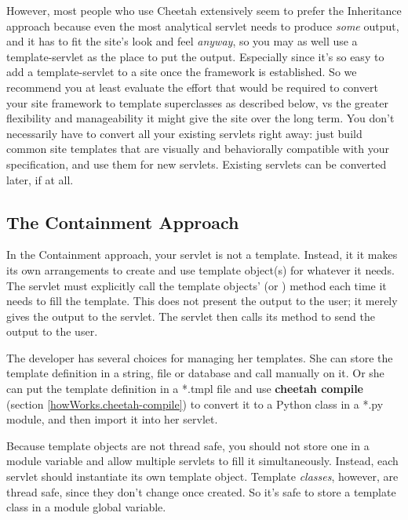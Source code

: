 However, most people who use Cheetah extensively seem
to prefer the Inheritance approach because even the most analytical servlet
needs to produce {\em some} output, and it has to fit the site's look and feel
{\em anyway}, so you may as well use a template-servlet as the place to put the
output.  Especially since it's so easy to add a template-servlet to a site once
the framework is established.  So we recommend you at least evaluate the
effort that would be required to convert your site framework to template
superclasses as described below, vs the greater flexibility and manageability
it might give the site over the long term.  You don't necessarily have to
convert all your existing servlets right away: just build common site templates
that are visually and behaviorally compatible with your specification, and use
them for new servlets.  Existing servlets can be converted later, if at all.


\subsection{The Containment Approach}
\label{webware.containment}

In the Containment approach, your servlet is not a template.  Instead, it 
it makes its own arrangements to create and use template object(s) for whatever
it needs.  The servlet must explicitly call the template objects'
 (or ) method each time it needs to fill
the template.  This does not present the output to the user; it merely gives
the output to the servlet.  The servlet then calls its
 method to send the output to the user.

The developer has several choices for managing her templates.  She can store the
template definition in a string, file or database and call
 manually on it.  Or she can put the
template definition in a *.tmpl file and use {\bf cheetah compile} (section
\ref{howWorks.cheetah-compile}) to convert it to a Python class in a *.py
module, and then import it into her servlet.

Because template objects are not thread safe, you should not store one
in a module variable and allow multiple servlets to fill it simultaneously.
Instead, each servlet should instantiate its own template object.  Template
{\em classes}, however, are thread safe, since they don't change once created.
So it's safe to store a template class in a module global variable.


